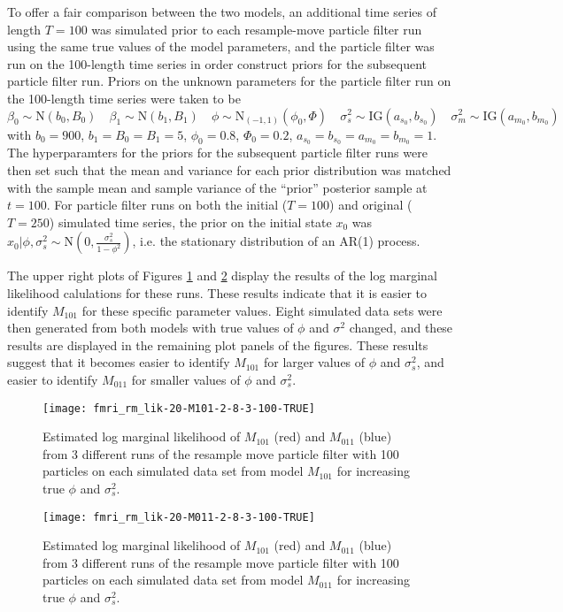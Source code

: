 \documentclass{article}
\begin{document}
To offer a fair comparison between the two models, an additional time series of length $T = 100$ was simulated prior to each resample-move particle filter run using the same true values of the model parameters, and the particle filter was run on the 100-length time series in order construct priors for the subsequent particle filter run. Priors on the unknown parameters for the particle filter run on the 100-length time series were taken to be \[ \beta_0 \sim \mbox{N}(b_0,B_0) \quad \beta_1 \sim \mbox{N}(b_1,B_1) \quad \phi \sim \mbox{N}_{(-1,1)}(\phi_0,\Phi) \quad \sigma^2_s \sim \mbox{IG}(a_{s_0},b_{s_0}) \quad \sigma^2_m \sim \mbox{IG}(a_{m_0},b_{m_0}) \] with $b_0 = 900$, $b_1 = B_0 = B_1 = 5$, $\phi_0 = 0.8$, $\Phi_0 = 0.2$, $a_{s_0} = b_{s_0} = a_{m_0} = b_{m_0} = 1$. The hyperparamters for the priors for the subsequent particle filter runs were then set such that the mean and variance for each prior distribution was matched with the sample mean and sample variance of the ``prior'' posterior sample at $t = 100$. For particle filter runs on both the initial ($T = 100$) and original ($T = 250$) simulated time series, the prior on the initial state $x_0$ was $x_0|\phi,\sigma^2_s \sim \mbox{N}(0,\frac{\sigma^2_s}{1-\phi^2})$, i.e. the stationary distribution of an AR(1) process.

The upper right plots of Figures \ref{fig:fmri-lik-n-M101} and \ref{fig:fmri-lik-n-M011} display the results of the log marginal likelihood calulations for these runs. These results indicate that it is easier to identify $M_{101}$ for these specific parameter values. Eight simulated data sets were then generated from both models with true values of $\phi$ and $\sigma^2$ changed, and these results are displayed in the remaining plot panels of the figures. These results suggest that it becomes easier to identify $M_{101}$ for larger values of $\phi$ and $\sigma^2_s$, and easier to identify $M_{011}$ for smaller values of $\phi$ and $\sigma^2_s$.

\begin{figure}[ht]
\texttt{[image: fmri\_rm\_lik-20-M101-2-8-3-100-TRUE]}
\caption{Estimated log marginal likelihood of $M_{101}$ (red) and $M_{011}$ (blue) from 3 different runs of the resample move particle filter with 100 particles on each simulated data set from model $M_{101}$ for increasing true $\phi$ and $\sigma^2_s$.} \label{fig:fmri-lik-n-M101}
\end{figure}

\begin{figure}[ht]
\texttt{[image: fmri\_rm\_lik-20-M011-2-8-3-100-TRUE]}
\caption{Estimated log marginal likelihood of $M_{101}$ (red) and $M_{011}$ (blue) from 3 different runs of the resample move particle filter with 100 particles on each simulated data set from model $M_{011}$ for increasing true $\phi$ and $\sigma^2_s$.} \label{fig:fmri-lik-n-M011}
\end{figure}
\end{document}
